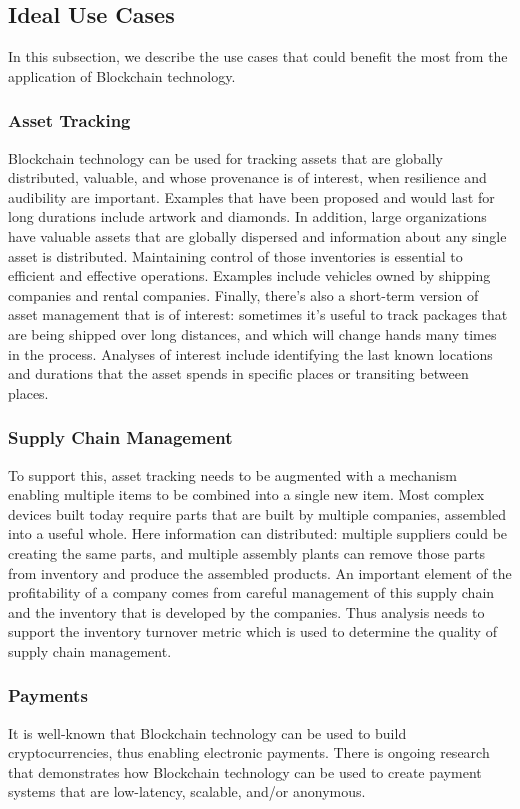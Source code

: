 \subsection{Ideal Use Cases}
In this subsection, we describe the use cases that could benefit the most from the application of Blockchain technology.

\subsubsection{Asset Tracking} Blockchain technology can be used for tracking assets that are globally distributed, valuable, and whose provenance is of interest, when resilience and audibility are important.  Examples that have been proposed and would last for long durations include artwork and diamonds.  In addition, large organizations have valuable assets that are globally dispersed and information about any single asset is distributed.  Maintaining control of those inventories is essential to efficient and effective operations.  Examples include vehicles owned by shipping companies and rental companies.  Finally, there's also a short-term version of asset management that is of interest: sometimes it's useful to track packages that are being shipped over long distances, and which will change hands many times in the process.  Analyses of interest include identifying the last known locations and durations that the asset spends in specific places or transiting between places.

\subsubsection{Supply Chain Management}
To support this, asset tracking needs to be augmented with a mechanism enabling multiple items to be combined into a single new item.  Most complex devices built today require parts that are built by multiple companies, assembled into a useful whole. Here information can distributed: multiple suppliers could be creating the same parts, and multiple assembly plants can remove those parts from inventory and produce the assembled products.  An important element of the profitability of a company comes from careful management of this supply chain and the inventory that is developed by the companies.  Thus analysis needs to support the inventory turnover metric which is used to determine the quality of supply chain management.

\subsubsection{Payments}
It is well-known that Blockchain technology can be used to build cryptocurrencies, thus enabling electronic payments.
There is ongoing research that demonstrates how Blockchain technology can be used to create payment systems that are low-latency, scalable, and/or anonymous.

